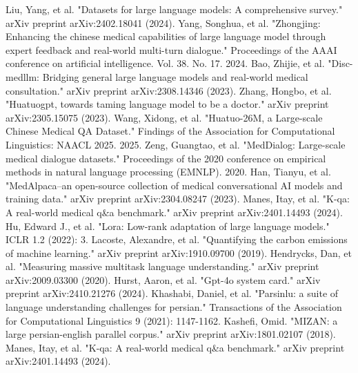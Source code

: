 \documentclass[conference]{IEEEtran}
\begin{document}
\begin{thebibliography}{00}
Liu, Yang, et al. "Datasets for large language models: A comprehensive survey." arXiv preprint arXiv:2402.18041 (2024).
Yang, Songhua, et al. "Zhongjing: Enhancing the chinese medical capabilities of large language model through expert feedback and real-world multi-turn dialogue." Proceedings of the AAAI conference on artificial intelligence. Vol. 38. No. 17. 2024.
Bao, Zhijie, et al. "Disc-medllm: Bridging general large language models and real-world medical consultation." arXiv preprint arXiv:2308.14346 (2023).
Zhang, Hongbo, et al. "Huatuogpt, towards taming language model to be a doctor." arXiv preprint arXiv:2305.15075 (2023).
Wang, Xidong, et al. "Huatuo-26M, a Large-scale Chinese Medical QA Dataset." Findings of the Association for Computational Linguistics: NAACL 2025. 2025.
Zeng, Guangtao, et al. "MedDialog: Large-scale medical dialogue datasets." Proceedings of the 2020 conference on empirical methods in natural language processing (EMNLP). 2020.
Han, Tianyu, et al. "MedAlpaca--an open-source collection of medical conversational AI models and training data." arXiv preprint arXiv:2304.08247 (2023).
Manes, Itay, et al. "K-qa: A real-world medical q\&a benchmark." arXiv preprint arXiv:2401.14493 (2024).
Hu, Edward J., et al. "Lora: Low-rank adaptation of large language models." ICLR 1.2 (2022): 3.
Lacoste, Alexandre, et al. "Quantifying the carbon emissions of machine learning." arXiv preprint arXiv:1910.09700 (2019).
Hendrycks, Dan, et al. "Measuring massive multitask language understanding." arXiv preprint arXiv:2009.03300 (2020).
Hurst, Aaron, et al. "Gpt-4o system card." arXiv preprint arXiv:2410.21276 (2024).
Khashabi, Daniel, et al. "Parsinlu: a suite of language understanding challenges for persian." Transactions of the Association for Computational Linguistics 9 (2021): 1147-1162.
Kashefi, Omid. "MIZAN: a large persian-english parallel corpus." arXiv preprint arXiv:1801.02107 (2018).
Manes, Itay, et al. "K-qa: A real-world medical q\&a benchmark." arXiv preprint arXiv:2401.14493 (2024).
\end{thebibliography}
\end{document}
